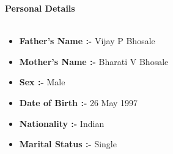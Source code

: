 \documentclass[15pt]{article}
\begin{document}
\vspace{1mm}
\begin{flushleft}
	{\textbf{Personal Details}} \\
	\vspace{0.5mm}
	\noindent \hrulefill 
	\vspace{0.5mm} \\
	\begin{itemize}
		\item \textbf{Father's Name :-} Vijay P Bhosale
		\item \textbf{Mother's Name :-} Bharati V Bhosale
		\item \textbf{Sex :-} Male
		\item \textbf{Date of Birth :-} 26 May 1997
		\item \textbf{Nationality :-} Indian
		\item \textbf{Marital Status :-} Single
	\end{itemize}
\end{flushleft}
\end{document}
